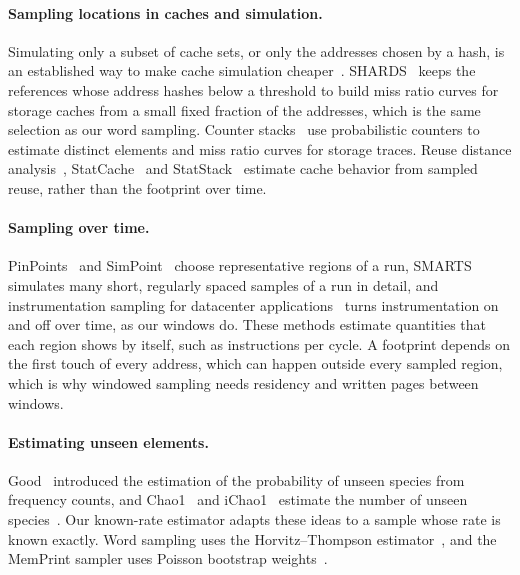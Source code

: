 \documentclass[11pt]{article}
\newcommand{\memprint}{MemPrint}
\begin{document}
\paragraph{Sampling locations in caches and simulation.}
Simulating only a subset of cache sets, or only the addresses chosen by a hash, is an established way to make cache simulation cheaper~\cite{kessler1994}. SHARDS~\cite{waldspurger2015shards} keeps the references whose address hashes below a threshold to build miss ratio curves for storage caches from a small fixed fraction of the addresses, which is the same selection as our word sampling. Counter stacks~\cite{wires2014counterstacks} use probabilistic counters to estimate distinct elements and miss ratio curves for storage traces. Reuse distance analysis~\cite{mattson1970,Beyls2005ReuseDistance}, StatCache~\cite{Berg2013StatCache} and StatStack~\cite{eklov2010statstack} estimate cache behavior from sampled reuse, rather than the footprint over time.

\paragraph{Sampling over time.}
PinPoints~\cite{patil2005pinpoints} and SimPoint~\cite{sherwood2002simpoint} choose representative regions of a run, SMARTS~\cite{wunderlich2003smarts} simulates many short, regularly spaced samples of a run in detail, and instrumentation sampling for datacenter applications~\cite{cho2013instrumentation} turns instrumentation on and off over time, as our windows do. These methods estimate quantities that each region shows by itself, such as instructions per cycle. A footprint depends on the first touch of every address, which can happen outside every sampled region, which is why windowed sampling needs residency and written pages between windows.

\paragraph{Estimating unseen elements.}
Good~\cite{good1953} introduced the estimation of the probability of unseen species from frequency counts, and Chao1~\cite{chao1984} and iChao1~\cite{chiu2014ichao} estimate the number of unseen species~\cite{bunge1993}. Our known-rate estimator adapts these ideas to a sample whose rate is known exactly. Word sampling uses the Horvitz--Thompson estimator~\cite{horvitz1952,cochran1977}, and the \memprint{} sampler uses Poisson bootstrap weights~\cite{efron1979,hanley2006poisson}.
\end{document}
